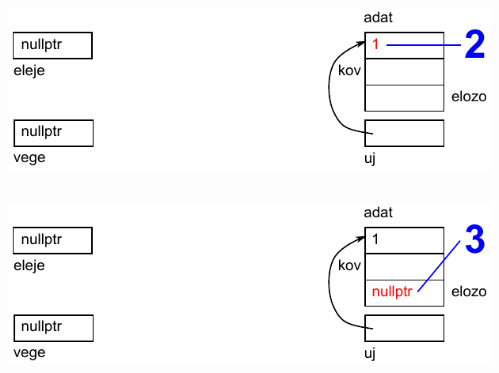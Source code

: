 \begin{frame}
  \begin{columns}[c]
      \scriptsize
      \begin{exampleblock}{}
        \vspace{-.2cm}
        
        \vspace{-.2cm}
      \end{exampleblock}
      \includegraphics[width=\textwidth]{sor/sor03.pdf}
  \end{columns}
\end{frame}

\begin{frame}
  \begin{columns}[c]
      \scriptsize
      \begin{exampleblock}{}
        \vspace{-.2cm}
        
        \vspace{-.2cm}
      \end{exampleblock}
      \includegraphics[width=\textwidth]{sor/sor04.pdf}
  \end{columns}
\end{frame}

